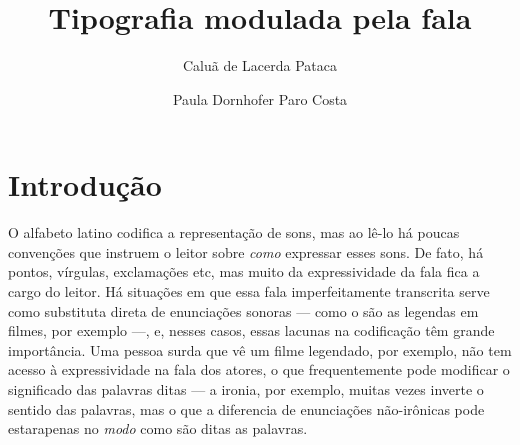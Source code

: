 \documentclass[11pt]{article}
\title{Tipografia modulada pela fala}
\author{Caluã de Lacerda Pataca \and Paula Dornhofer Paro Costa}
\begin{document}
\hyphenation{}
\pagestyle{fancy}


  \section{Introdu\c{c}\~{a}o}
  \label{sec:introducao}

  O alfabeto latino codifica a representação de sons, mas ao lê-lo há poucas convenções que instruem o leitor sobre {\itshape como} expressar esses sons. De fato, há pontos, vírgulas, exclamações etc, mas muito da expressividade da fala fica a cargo do leitor. Há situações em que essa fala imperfeitamente transcrita serve como substituta direta de enunciações sonoras --- como o são as legendas em filmes, por exemplo ---, e, nesses casos, essas lacunas na codificação têm grande importância. Uma pessoa surda que vê um filme legendado, por exemplo, não tem acesso à expressividade na fala dos atores, o que frequentemente pode modificar o significado das palavras ditas --- a ironia, por exemplo, muitas vezes inverte o sentido das palavras, mas o que a diferencia de enunciações não-irônicas pode estarapenas no {\itshape modo} como são ditas as palavras.
  
\end{document}
